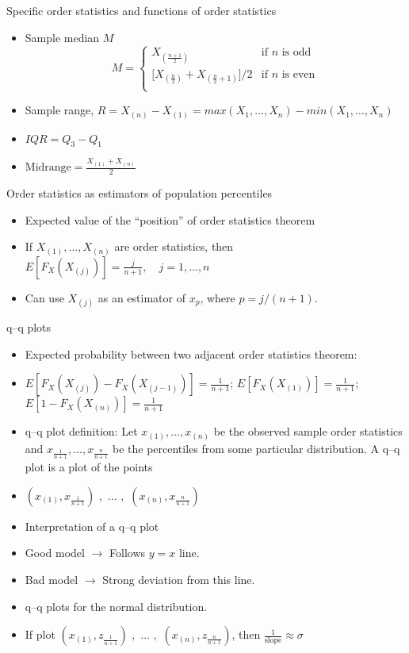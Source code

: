 \documentclass{article}
\newcommand{\vecn}[2]{#1_1, \ldots, #1_{#2}}	%
\newcommand{\order}[2]{#1_{(#2)}}		%
\begin{document}
Specific order statistics and functions of order statistics
\begin{itemize}
    \item Sample median $M$
    \[M =
    \left\{
    \begin{array}{ll}
        \order{X}{\frac{n+1}{2}} & \text{if $n$ is odd}\\
        \big[\order{X}{\frac{n}{2}} + \order{X}{\frac{n}{2} + 1}\big] / 2 & \text{if $n$ is even}\\
    \end{array}
    \right.\]
    \item Sample range, $R = \order{X}{n} - \order{X}{1} = max(\vecn{X}{n}) - min(\vecn{X}{n})$
    \item $IQR = Q_3 - Q_1$
    \item $\displaystyle \text{Midrange} = \frac{\order{X}{1} + \order{X}{n}}{2}$
\end{itemize}\bigskip

Order statistics as estimators of population percentiles
\begin{itemize}
    \item Expected value of the ``position'' of order statistics theorem
    \item[] If $\order{X}{1}, \ldots, \order{X}{n}$ are order statistics, then $\displaystyle E[F_X(\order{X}{j})] = \frac{j}{n+1}, \quad j = 1, \ldots, n$
    \item[] Can use $\order{X}{j}$ as an estimator of $x_p$, where $p = j / (n+1)$.
\end{itemize}\bigskip

q--q plots
\begin{itemize}
    \item Expected probability between two adjacent order statistics theorem:
    \item[] $E[F_X(\order{X}{j}) - F_X(\order{X}{j-1})] = \frac{1}{n+1}$; \hspace{20pt}$E[F_X(\order{X}{1})] = \frac{1}{n+1}$; \hspace{20pt} $E[1 - F_X(\order{X}{n})] = \frac{1}{n+1}$
    \item q--q plot definition: Let $\order{x}{1}, \dots, \order{x}{n}$ be the observed sample order statistics and $x_{\frac{1}{n+1}}, \ldots, x_{\frac{n}{n+1}}$ be the percentiles from some particular distribution. A q--q plot is a plot of the points
    \item[] $(\order{x}{1}, x_{\frac{1}{n+1}}) \,\, , \,\, \ldots \,\, , \,\, (\order{x}{n}, x_{\frac{n}{n+1}})$
    \item Interpretation of a q--q plot
    \item[] Good model $\rightarrow$ Follows $y = x$ line.
    \item[] Bad model $\rightarrow$ Strong deviation from this line.
    \item q--q plots for the normal distribution.
    \item[] If plot $(\order{x}{1}, z_{\frac{1}{n+1}}) \,\, , \,\, \ldots \,\, , \,\, (\order{x}{n}, z_{\frac{n}{n+1}})$, then $\frac{1}{\text{slope}} \approx \sigma$
\end{itemize}\bigskip
\end{document}
